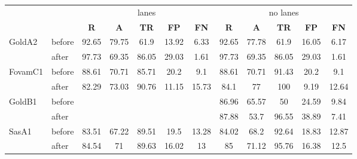 
    \begin{tabular}{|l|l||c|c|c|c|c|c|c|c|c|c|}
\cmidrule{3-12}    \multicolumn{1}{r}{} & \multicolumn{1}{r|}{} & \multicolumn{5}{c|}{lanes}            & \multicolumn{5}{c|}{no lanes} \\
\cmidrule{3-12}    \multicolumn{1}{r}{} & \multicolumn{1}{r|}{} & \textbf{R} & \textbf{A} & \textbf{TR} & \textbf{FP} & \textbf{FN} & \textbf{R} & \textbf{A} & \textbf{TR} & \textbf{FP} & \textbf{FN} \\
\midrule
\midrule
    \multirow{2}[3]{*}{GoldA2} & before & 92.65 & 79.75 & 61.9  & 13.92 & 6.33  & 92.65 & 77.78 & 61.9  & 16.05 & 6.17 \\
\cmidrule{2-12}          & after & 97.73 & 69.35 & 86.05 & 29.03 & 1.61  & 97.73 & 69.35 & 86.05 & 29.03 & 1.61 \\
    \midrule
    \multirow{2}[4]{*}{FovamC1} & before & 88.61 & 70.71 & 85.71 & 20.2  & 9.1   & 88.61 & 70.71 & 91.43 & 20.2  & 9.1 \\
\cmidrule{2-12}          & after & 82.29 & 73.03 & 90.76 & 11.15 & 15.73 & 84.1  & 77    & 100   & 9.19  & 12.64 \\
    \midrule
    \multirow{2}[4]{*}{GoldB1} & before & \multicolumn{5}{c|}{\multirow{2}[4]{*}{}} & 86.96 & 65.57 & 50    & 24.59 & 9.84 \\
\cmidrule{2-2}\cmidrule{8-12}          & after & \multicolumn{5}{c|}{}                 & 87.88 & 53.7  & 96.55 & 38.89 & 7.41 \\
    \midrule
    \multirow{2}[4]{*}{SasA1} & before & 83.51 & 67.22 & 89.51 & 19.5  & 13.28 & 84.02 & 68.2  & 92.64 & 18.83 & 12.87 \\
\cmidrule{2-12}          & after & 84.54 & 71    & 89.63 & 16.02 & 13    & 85    & 71.12 & 95.76 & 16.38 & 12.5 \\
    \bottomrule
    \end{tabular}%

